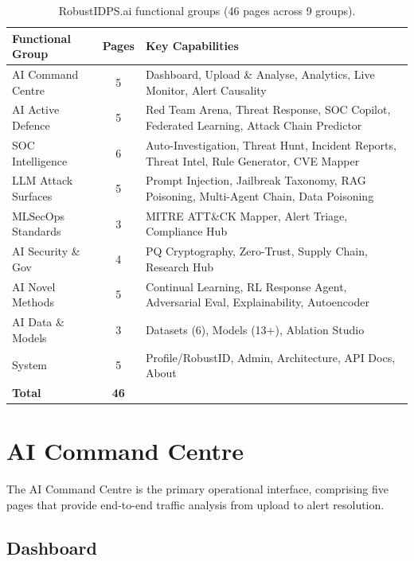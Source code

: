\begin{table}[htbp]
\centering
\caption{RobustIDPS.ai functional groups (46 pages across 9 groups).}
\label{tab:functional_groups}
\small
\begin{tabular}{lcp{7.5cm}}
\toprule
\textbf{Functional Group} & \textbf{Pages} & \textbf{Key Capabilities} \\
\midrule
AI Command Centre      & 5 & Dashboard, Upload \& Analyse, Analytics, Live Monitor, Alert Causality \\
AI Active Defence      & 5 & Red Team Arena, Threat Response, SOC Copilot, Federated Learning, Attack Chain Predictor \\
SOC Intelligence       & 6 & Auto-Investigation, Threat Hunt, Incident Reports, Threat Intel, Rule Generator, CVE Mapper \\
LLM Attack Surfaces    & 5 & Prompt Injection, Jailbreak Taxonomy, RAG Poisoning, Multi-Agent Chain, Data Poisoning \\
MLSecOps Standards     & 3 & MITRE ATT\&CK Mapper, Alert Triage, Compliance Hub \\
AI Security \& Gov     & 4 & PQ Cryptography, Zero-Trust, Supply Chain, Research Hub \\
AI Novel Methods       & 5 & Continual Learning, RL Response Agent, Adversarial Eval, Explainability, Autoencoder \\
AI Data \& Models      & 3 & Datasets (6), Models (13+), Ablation Studio \\
System                 & 5 & Profile/RobustID, Admin, Architecture, API Docs, About \\
\midrule
\textbf{Total}         & \textbf{46} & \\
\bottomrule
\end{tabular}
\end{table}


\section{AI Command Centre}
\label{sec:command_centre}

The AI Command Centre is the primary operational interface, comprising five pages that provide end-to-end traffic analysis from upload to alert resolution.

\subsection{Dashboard}

